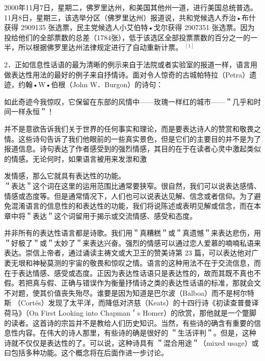 \begin{displayquote}
2000年11月7日，星期二，佛罗里达州，和美国其他州一道，进行美国总统普选。11月8日，星期三，该选举分区（佛罗里达州）报道说，共和党候选人乔治•布什获得 2909135 张选票，民主党候选人小艾伯特•戈尔获得 2907351 张选票。因为投给他们的全部票数的总差（1784张），低于该选区全部投票票数的百分之一的一半，所以根据佛罗里达州法律规定进行了自动重新计票。 ${ }^{[1]}$
\end{displayquote}

2．正如信息性话语的最为清晰的例示来自于法院或者实验室的报道一样，语言用做表达性用法的最好的例子来自抒情诗。面对令人惊奇的古城帕特拉（Petra）遗迹，约翰•W•伯根（John W．Burgon）的诗句：

\begin{displayquote}
如此奇迹今我惊叹，它保留在东部的风情中——玫瑰一样红的城市——＂几乎和时间一样永恒＂！
\end{displayquote}

并不是意欲告诉我们关于世界的任何事实和理论，而是要表达诗人的赞赏和敬畏之情。这些诗句告诉了我们他眼前的一些真实景色，但是它们的主要目的并不是为了报道信息。诗句表达了作者感受到的强烈情感，其目的在于在读者心灵中激起类似的情感。无论何时，如果语言被用来发泄和激

发情感，那么它就具有表达性的功能。\\
＂表达＂这个词在这里的运用范围比通常要狭窄。很自然，我们可以说表达感情、情感或态度等。但是通常情况下，人们也可以说表达见解、信念或者信仰。为了避免混淆语言的信息性的和表达性的功能，我们将说陈述或表明见解或信念，而在本章中将＂表达＂这个词留用于揭示或交流情感、感受和态度。

并非所有的表达性语言都是诗歌。我们用＂真糟糕＂或＂真遗憾＂来表达悲伤，用＂好极了＂或＂太妙了＂来表达兴奋。强烈的情感可以通过恋人爱慕的喃喃私语来表达。崇信上帝者，通过诵读主祷文或大卫王的赞美诗第 23 篇，可以表达他对广袤无垠和神秘莫测的宇宙的敬畏和惊叹之情。语言的这种用法不在于交流信息，而在于表达情感、感受或态度。正因为表达性话语只是表达性的，故而其既不真也不假。若把真与假、正确与错误作为衡量抒情诗之类的表达性话语的标准，那就会文不对题，使其价值丧失殆尽。谁要是因为知道是巴尔波（Balboa）而不是柯尔特斯 （Cortés）发现了太平洋，而降低对济慈（Keats）的十四行诗《初读查普曼译荷马》（On First Looking into Chapman＇s Homer）的欣赏，那他就是一个蹩脚的读者。这首诗的宗旨并不是教给人们历史知识。当然，有些诗的确含有重要的信息性内容。在伟大的诗人那里，有些诗的确是很好的 ＂生活评判＂。但是，这种诗就不仅仅是表达性的了。可以说，这种诗具有 ＂混合用途＂（mixed usage）或曰包括多种功能。这个概念将在后面作进一步讨论。

